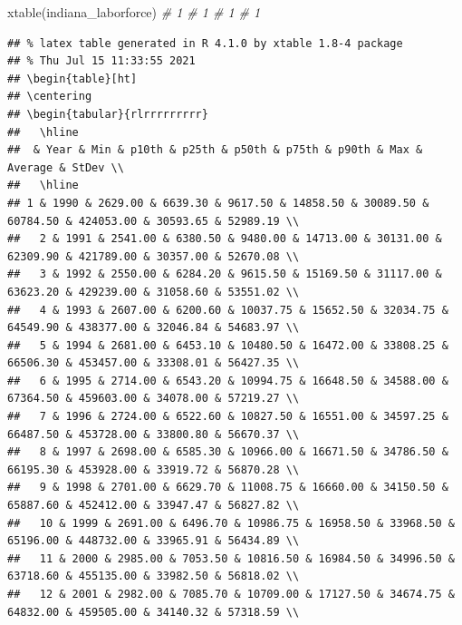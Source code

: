 \documentclass[
]{book}
\newenvironment{Shaded}{\begin{snugshade}}{\end{snugshade}}
\newcommand{\CommentTok}[1]{\textcolor[rgb]{0.56,0.35,0.01}{\textit{#1}}}
\newcommand{\FunctionTok}[1]{\textcolor[rgb]{0.00,0.00,0.00}{#1}}
\newcommand{\NormalTok}[1]{#1}
\begin{document}
\begin{Shaded}
\begin{Highlighting}[]
  \FunctionTok{xtable}\NormalTok{(indiana\_laborforce)  }\CommentTok{\# 1  \# 1  \# 1  \# 1}
\end{Highlighting}
\end{Shaded}

\begin{verbatim}
## % latex table generated in R 4.1.0 by xtable 1.8-4 package
## % Thu Jul 15 11:33:55 2021
## \begin{table}[ht]
## \centering
## \begin{tabular}{rlrrrrrrrrr}
##   \hline
##  & Year & Min & p10th & p25th & p50th & p75th & p90th & Max & Average & StDev \\ 
##   \hline
## 1 & 1990 & 2629.00 & 6639.30 & 9617.50 & 14858.50 & 30089.50 & 60784.50 & 424053.00 & 30593.65 & 52989.19 \\ 
##   2 & 1991 & 2541.00 & 6380.50 & 9480.00 & 14713.00 & 30131.00 & 62309.90 & 421789.00 & 30357.00 & 52670.08 \\ 
##   3 & 1992 & 2550.00 & 6284.20 & 9615.50 & 15169.50 & 31117.00 & 63623.20 & 429239.00 & 31058.60 & 53551.02 \\ 
##   4 & 1993 & 2607.00 & 6200.60 & 10037.75 & 15652.50 & 32034.75 & 64549.90 & 438377.00 & 32046.84 & 54683.97 \\ 
##   5 & 1994 & 2681.00 & 6453.10 & 10480.50 & 16472.00 & 33808.25 & 66506.30 & 453457.00 & 33308.01 & 56427.35 \\ 
##   6 & 1995 & 2714.00 & 6543.20 & 10994.75 & 16648.50 & 34588.00 & 67364.50 & 459603.00 & 34078.00 & 57219.27 \\ 
##   7 & 1996 & 2724.00 & 6522.60 & 10827.50 & 16551.00 & 34597.25 & 66487.50 & 453728.00 & 33800.80 & 56670.37 \\ 
##   8 & 1997 & 2698.00 & 6585.30 & 10966.00 & 16671.50 & 34786.50 & 66195.30 & 453928.00 & 33919.72 & 56870.28 \\ 
##   9 & 1998 & 2701.00 & 6629.70 & 11008.75 & 16660.00 & 34150.50 & 65887.60 & 452412.00 & 33947.47 & 56827.82 \\ 
##   10 & 1999 & 2691.00 & 6496.70 & 10986.75 & 16958.50 & 33968.50 & 65196.00 & 448732.00 & 33965.91 & 56434.89 \\ 
##   11 & 2000 & 2985.00 & 7053.50 & 10816.50 & 16984.50 & 34996.50 & 63718.60 & 455135.00 & 33982.50 & 56818.02 \\ 
##   12 & 2001 & 2982.00 & 7085.70 & 10709.00 & 17127.50 & 34674.75 & 64832.00 & 459505.00 & 34140.32 & 57318.59 \\ 

\end{verbatim}
\end{document}
